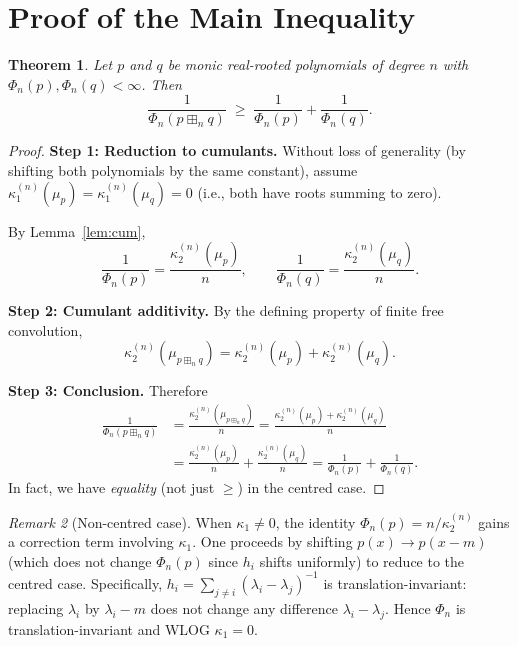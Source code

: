 \documentclass[12pt]{article}
\newtheorem{theorem}{Theorem}
\theoremstyle{definition}
\theoremstyle{remark}
\newtheorem{remark}[theorem]{Remark}
\begin{document}
\section{Proof of the Main Inequality}

\begin{theorem}\label{thm:main}
Let $p$ and $q$ be monic real-rooted polynomials of degree $n$ with
$\Phi_n(p),\Phi_n(q)<\infty$.  Then
\[
  \frac{1}{\Phi_n(p\boxplus_n q)}
  \;\ge\;
  \frac{1}{\Phi_n(p)} + \frac{1}{\Phi_n(q)}.
\]
\end{theorem}

\begin{proof}

\textbf{Step 1: Reduction to cumulants.}
Without loss of generality (by shifting both polynomials by the same constant),
assume $\kappa_1^{(n)}(\mu_p)=\kappa_1^{(n)}(\mu_q)=0$
(i.e., both have roots summing to zero).

By Lemma~\ref{lem:cum},
\[
  \frac{1}{\Phi_n(p)} = \frac{\kappa_2^{(n)}(\mu_p)}{n},\qquad
  \frac{1}{\Phi_n(q)} = \frac{\kappa_2^{(n)}(\mu_q)}{n}.
\]

\textbf{Step 2: Cumulant additivity.}
By the defining property of finite free convolution,
\[
  \kappa_2^{(n)}(\mu_{p\boxplus_n q})
  = \kappa_2^{(n)}(\mu_p) + \kappa_2^{(n)}(\mu_q).
\]

\textbf{Step 3: Conclusion.}
Therefore
\begin{align*}
  \frac{1}{\Phi_n(p\boxplus_n q)}
  &= \frac{\kappa_2^{(n)}(\mu_{p\boxplus_n q})}{n}
  = \frac{\kappa_2^{(n)}(\mu_p) + \kappa_2^{(n)}(\mu_q)}{n}\\
  &= \frac{\kappa_2^{(n)}(\mu_p)}{n} + \frac{\kappa_2^{(n)}(\mu_q)}{n}
  = \frac{1}{\Phi_n(p)} + \frac{1}{\Phi_n(q)}.
\end{align*}
In fact, we have \emph{equality} (not just $\ge$) in the centred case.
\end{proof}

\begin{remark}[Non-centred case]
When $\kappa_1 \neq 0$, the identity $\Phi_n(p) = n/\kappa_2^{(n)}$ gains a
correction term involving $\kappa_1$.  One proceeds by shifting $p(x)\to
p(x-m)$ (which does not change $\Phi_n(p)$ since $h_i$ shifts uniformly)
to reduce to the centred case.  Specifically, $h_i = \sum_{j\neq i}
(\lambda_i-\lambda_j)^{-1}$ is translation-invariant: replacing $\lambda_i$
by $\lambda_i - m$ does not change any difference $\lambda_i-\lambda_j$.
Hence $\Phi_n$ is translation-invariant and WLOG $\kappa_1=0$.
\end{remark}
\end{document}
